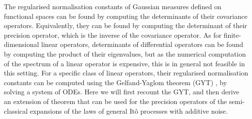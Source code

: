 \documentclass[]{cam-thesis}
\begin{document}
The regularised normalisation constants of Gaussian measures defined on functional
spaces can be found by computing the determinants of their covariance
operators. Equivalently, they can be found by computing
the determinant of their precision operator, which is the inverse
of the covariance operator. As for finite-dimensional linear operators,
determinants of differential operators can be found by computing the product of their
eigenvalues, but as the numerical computation of the spectrum of a linear operator is expensive, this is in general not feasible in this setting. For a specific class of linear operators, their regularised normalisation constants can be computed using the Gelfand-Yaglom theorem (GYT) \citep{gelfandIntegrationFunctionalSpaces1960a, levitTheoremInfiniteProducts1977a, dunneFunctionalDeterminantsQuantum2008a}, by solving a system of ODEs. Here we will first recount the GYT, and then derive an extension of theorem that can be used for the precision operators of the semi-classical expansions of the laws of general It\^{o} processes with additive noise.
\end{document}
